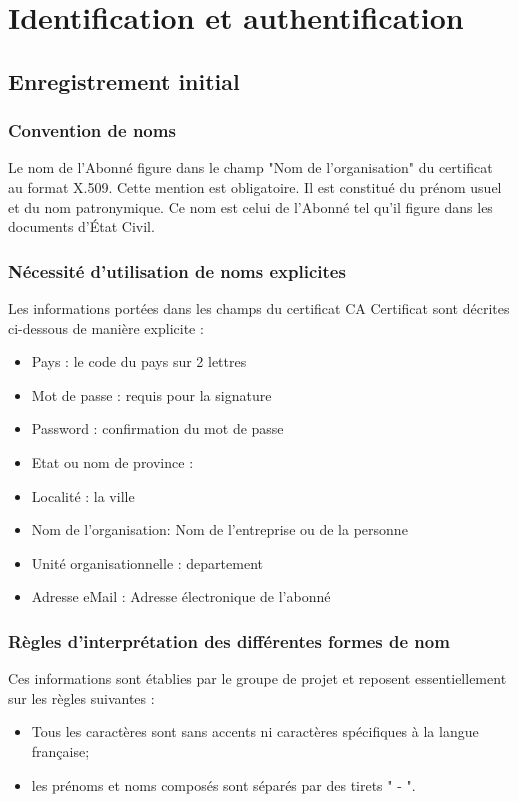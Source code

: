 \documentclass[a4paper,11pt,french]{article}
\begin{document}
\section{Identification et authentification}
\subsection{Enregistrement initial}
\subsubsection{Convention de noms}
Le nom de l'Abonné figure dans le champ "Nom de l'organisation" du certificat au format X.509. Cette mention est obligatoire. Il est constitué du prénom usuel et du nom patronymique. Ce nom est celui de l'Abonné tel qu'il figure dans les documents d'État Civil.

\subsubsection{Nécessité d'utilisation de noms explicites}

Les informations portées dans les champs du certificat CA Certificat sont décrites ci-dessous de manière explicite :
\begin{itemize}
\item Pays : le code du pays sur 2 lettres
\item Mot de passe : requis pour la signature
\item Password : confirmation du mot de passe
\item Etat ou nom de province : 
\item Localité : la ville
\item Nom de l'organisation: Nom de l'entreprise ou de la personne
\item Unité organisationnelle : departement
\item Adresse eMail : Adresse électronique de l'abonné

\end{itemize}

\subsubsection{Règles d'interprétation des différentes formes de nom}
Ces informations sont établies par le groupe de projet et reposent essentiellement sur les règles
suivantes :
\begin{itemize}
\item Tous les caractères sont sans accents ni caractères spécifiques à la langue française;
\item les prénoms et noms composés sont séparés par des tirets " - ".

\end{itemize}
\end{document}
